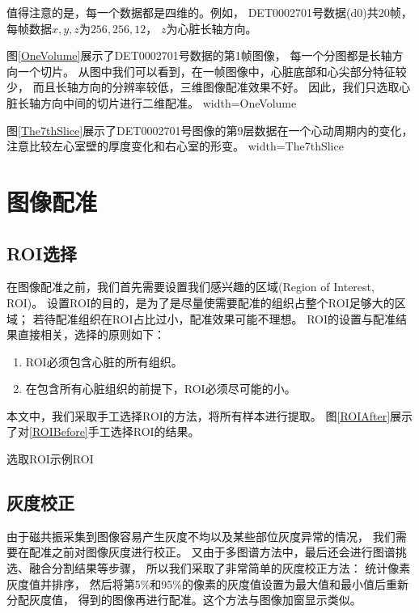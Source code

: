 值得注意的是，每一个数据都是四维的。例如，
DET0002701号数据(d0)共20帧，每帧数据$x,y,z$为$256,256,12$，
$z$为心脏长轴方向。

图\ref{OneVolume}展示了DET0002701号数据的第1帧图像，
每一个分图都是长轴方向一个切片。
从图中我们可以看到，在一帧图像中，心脏底部和心尖部分特征较少，
而且长轴方向的分辨率较低，三维图像配准效果不好。
因此，我们只选取心脏长轴方向中间的切片进行二维配准。
%
{width=\textwidth}{OneVolume}

图\ref{The7thSlice}展示了DET0002701号图像的第9层数据在一个心动周期内的变化，
注意比较左心室壁的厚度变化和右心室的形变。
%
{width=\textwidth}{The7thSlice}

\section{图像配准}
\subsection{ROI选择}
在图像配准之前，我们首先需要设置我们感兴趣的区域(Region of Interest, ROI)。
设置ROI的目的，是为了是尽量使需要配准的组织占整个ROI足够大的区域；
若待配准组织在ROI占比过小，配准效果可能不理想。
ROI的设置与配准结果直接相关，选择的原则如下：
\begin{enumerate}
  \item ROI必须包含心脏的所有组织。
  \item 在包含所有心脏组织的前提下，ROI必须尽可能的小。
\end{enumerate}

本文中，我们采取手工选择ROI的方法，将所有样本进行提取。
图\ref{ROIAfter}展示了对\ref{ROIBefore}手工选择ROI的结果。
\begin{pics}[htbp]{选取ROI示例}{ROI}
\end{pics}

\subsection{灰度校正}
由于磁共振采集到图像容易产生灰度不均以及某些部位灰度异常的情况，
我们需要在配准之前对图像灰度进行校正。
又由于多图谱方法中，最后还会进行图谱挑选、融合分割结果等步骤，
所以我们采取了非常简单的灰度校正方法：
统计像素灰度值并排序，
然后将第5\%和95\%的像素的灰度值设置为最大值和最小值后重新分配灰度值，
得到的图像再进行配准。这个方法与图像加窗显示类似。

